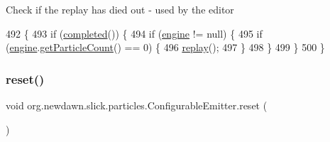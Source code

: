 Check if the replay has died out -\/ used by the editor 
\begin{DoxyCode}
492                               \{
493         \textcolor{keywordflow}{if} (\mbox{\hyperlink{classorg_1_1newdawn_1_1slick_1_1particles_1_1_configurable_emitter_abcb8dd0c86a998fc1f386254e4a27c86}{completed}}()) \{
494             \textcolor{keywordflow}{if} (\mbox{\hyperlink{classorg_1_1newdawn_1_1slick_1_1particles_1_1_configurable_emitter_ad35b105949c7f6c67f4dba02287b3a09}{engine}} != null) \{
495                 \textcolor{keywordflow}{if} (\mbox{\hyperlink{classorg_1_1newdawn_1_1slick_1_1particles_1_1_configurable_emitter_ad35b105949c7f6c67f4dba02287b3a09}{engine}}.\mbox{\hyperlink{classorg_1_1newdawn_1_1slick_1_1particles_1_1_particle_system_ad1e56b931fe0d2cea32cd23ff6d6a8fa}{getParticleCount}}() == 0) \{
496                     \mbox{\hyperlink{classorg_1_1newdawn_1_1slick_1_1particles_1_1_configurable_emitter_a86bf563a92e8c12e4390f822e872c696}{replay}}();
497                 \}
498             \}
499         \}
500     \}
\end{DoxyCode}
\mbox{\label{classorg_1_1newdawn_1_1slick_1_1particles_1_1_configurable_emitter_a6aeb253b52df08647d4f1f6710b76cbe}} 
\subsubsection{\texorpdfstring{reset()}{reset()}}
{\footnotesize\ttfamily void org.\+newdawn.\+slick.\+particles.\+Configurable\+Emitter.\+reset (\begin{DoxyParamCaption}{ }\end{DoxyParamCaption})\hspace{0.3cm}{\ttfamily [inline]}}

